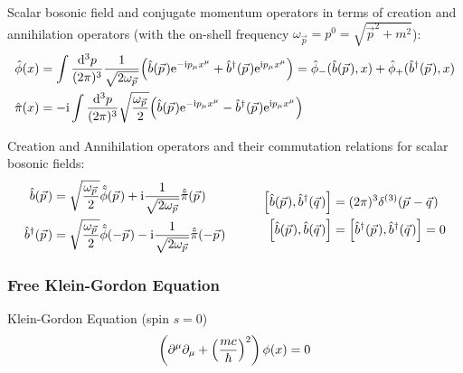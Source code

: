 			\noindent
			Scalar bosonic field and conjugate momentum operators in terms of creation and annihilation operators (with the on-shell frequency $\omega_{\vec{p}} = p^0 = \sqrt{\vec{p}^2 + m^2}$):
			\begin{equation}
				 \begin{aligned}
					\hat{\phi}(x) &= \int \frac{\dd^3 p}{(2\pi)^3} \frac{1}{\sqrt{2 \omega_{\vec{p}}}} \qty( \hat{b}(\vec{p}) \ex^{-\i p_\mu x^\mu} + \hat{b}^\dagger(\vec{p}) \ex^{\i p_\mu x^\mu} ) = \hat{\phi}_{-}(\hat{b}(\vec{p}),x) + \hat{\phi}_{+}(\hat{b}^\dagger(\vec{p}),x) \\
					\hat{\pi}(x) &= -\i \int \frac{\dd^3 p}{(2\pi)^3} \sqrt{\frac{\omega_{\vec{p}}}{2}} \qty( \hat{b}(\vec{p}) \ex^{-\i p_\mu x^\mu} - \hat{b}^\dagger(\vec{p}) \ex^{\i p_\mu x^\mu} ) \\
				 \end{aligned}
			\end{equation}
			
			\noindent
			Creation and Annihilation operators and their commutation relations for scalar bosonic fields:
			\begin{equation}
				\begin{aligned}
					\hat{b}(\vec{p}) &= \sqrt{\frac{\omega_{\vec{p}}}{2}} \hat{\tilde{\phi}}(\vec{p}) + \i \frac{1}{\sqrt{2 \omega_{\vec{p}}}} \hat{\tilde{\pi}}(\vec{p}) \\
					\hat{b}^\dagger(\vec{p}) &= \sqrt{\frac{\omega_{\vec{p}}}{2}} \hat{\tilde{\phi}}(-\vec{p}) - \i \frac{1}{\sqrt{2 \omega_{\vec{p}}}} \hat{\tilde{\pi}}(-\vec{p}) 
				\end{aligned}				
				\hsp
				\begin{aligned}
					\comm{\hat{b}(\vec{p})}{\hat{b}^\dagger(\vec{q})} &= (2\pi)^3 \delta^{(3)}(\vec{p}-\vec{q}) \\
					\Big[ \hat{b}(\vec{p}) , \hat{b}(\vec{q}) \Big] &= \comm{\hat{b}^\dagger(\vec{p})}{\hat{b}^\dagger(\vec{q})} = 0 \\
				\end{aligned}
			\end{equation}

		\subsubsection{Free Klein-Gordon Equation}
			\noindent
			Klein-Gordon Equation (spin $s=0$)
			\begin{equation}
				\left(\partial^\mu\partial_\mu+\qty(\frac{mc}{\hbar})^2\right) \phi(x) = 0
			\end{equation}

